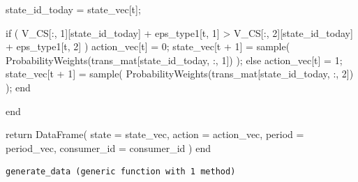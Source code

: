 \documentclass[
  letterpaper,
  DIV=11,
  numbers=noendperiod]{scrreprt}
\newenvironment{Shaded}{\begin{snugshade}}{\end{snugshade}}
\newcommand{\ControlFlowTok}[1]{\textcolor[rgb]{0.00,0.23,0.31}{#1}}
\newcommand{\FloatTok}[1]{\textcolor[rgb]{0.68,0.00,0.00}{#1}}
\newcommand{\FunctionTok}[1]{\textcolor[rgb]{0.28,0.35,0.67}{#1}}
\newcommand{\KeywordTok}[1]{\textcolor[rgb]{0.00,0.23,0.31}{#1}}
\newcommand{\NormalTok}[1]{\textcolor[rgb]{0.00,0.23,0.31}{#1}}
\newcommand{\OperatorTok}[1]{\textcolor[rgb]{0.37,0.37,0.37}{#1}}
\begin{document}
\begin{Shaded}
\begin{Highlighting}[]
\NormalTok{        state\_id\_today }\OperatorTok{=}\NormalTok{ state\_vec[t];}

        \ControlFlowTok{if}\NormalTok{ (}
\NormalTok{            V\_CS[}\OperatorTok{:}\NormalTok{, }\FloatTok{1}\NormalTok{][state\_id\_today] }\OperatorTok{+}\NormalTok{ eps\_type1[t, }\FloatTok{1}\NormalTok{] }\OperatorTok{\textgreater{}} 
\NormalTok{            V\_CS[}\OperatorTok{:}\NormalTok{, }\FloatTok{2}\NormalTok{][state\_id\_today] }\OperatorTok{+}\NormalTok{ eps\_type1[t, }\FloatTok{2}\NormalTok{]}
\NormalTok{            )}
\NormalTok{            action\_vec[t] }\OperatorTok{=} \FloatTok{0}\NormalTok{;}
\NormalTok{            state\_vec[t }\OperatorTok{+} \FloatTok{1}\NormalTok{] }\OperatorTok{=} \FunctionTok{sample}\NormalTok{(}
                \FunctionTok{ProbabilityWeights}\NormalTok{(trans\_mat[state\_id\_today, }\OperatorTok{:}\NormalTok{, }\FloatTok{1}\NormalTok{])}
\NormalTok{                );}
        \ControlFlowTok{else}
\NormalTok{            action\_vec[t] }\OperatorTok{=} \FloatTok{1}\NormalTok{;}
\NormalTok{            state\_vec[t }\OperatorTok{+} \FloatTok{1}\NormalTok{] }\OperatorTok{=} \FunctionTok{sample}\NormalTok{(}
                \FunctionTok{ProbabilityWeights}\NormalTok{(trans\_mat[state\_id\_today, }\OperatorTok{:}\NormalTok{, }\FloatTok{2}\NormalTok{])}
\NormalTok{                );}
        \ControlFlowTok{end}

    \ControlFlowTok{end}

    \ControlFlowTok{return} \FunctionTok{DataFrame}\NormalTok{(}
\NormalTok{        state }\OperatorTok{=}\NormalTok{ state\_vec, }
\NormalTok{        action }\OperatorTok{=}\NormalTok{ action\_vec, }
\NormalTok{        period }\OperatorTok{=}\NormalTok{ period\_vec,}
\NormalTok{        consumer\_id }\OperatorTok{=}\NormalTok{ consumer\_id}
\NormalTok{        )}
\KeywordTok{end}
\end{Highlighting}
\end{Shaded}

\begin{verbatim}
generate_data (generic function with 1 method)
\end{verbatim}
\end{document}

